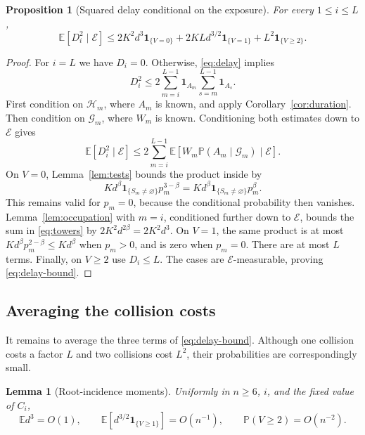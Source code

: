 \documentclass[11pt]{article}
\newtheorem{lemma}[theorem]{Lemma}
\newtheorem{proposition}[theorem]{Proposition}
\theoremstyle{remark}
\newcommand{\Prb}{\mathbb P}
\newcommand{\E}{\mathbb E}
\newcommand{\ind}{\mathbf 1}
\newcommand{\cE}{\mathcal E}
\newcommand{\cG}{\mathcal G}
\newcommand{\cH}{\mathcal H}
\numberwithin{equation}{section}
\begin{document}
\begin{proposition}[Squared delay conditional on the exposure]
\label{prop:delay}
For every $1\le i\le L$,
\begin{equation}
 \E[D_i^2\mid\cE]
 \le 2K^2d^3\ind_{\{V=0\}}
       +2KLd^{3/2}\ind_{\{V=1\}}
       +L^2\ind_{\{V\ge2\}}.
 \label{eq:delay-bound}
\end{equation}
\end{proposition}

\begin{proof}
For $i=L$ we have $D_i=0$. Otherwise, \eqref{eq:delay} implies
\[
 D_i^2\le2\sum_{m=i}^{L-1}\ind_{A_m}
                         \sum_{s=m}^{L-1}\ind_{A_s}.
\]
First condition on $\cH_m$, where $A_m$ is known, and apply
Corollary~\ref{cor:duration}. Then condition on $\cG_m$, where $W_m$
is known. Conditioning both estimates down to $\cE$ gives
\begin{equation}
 \E[D_i^2\mid\cE]
 \le2\sum_{m=i}^{L-1}
     \E[W_m\Prb(A_m\mid\cG_m)\mid\cE].
 \label{eq:towers}
\end{equation}
On $V=0$, Lemma~\ref{lem:tests} bounds the product inside by
\[
 Kd^\beta\ind_{\{S_m\ne\varnothing\}}p_m^{3-\beta}
   =Kd^\beta\ind_{\{S_m\ne\varnothing\}}p_m^\beta.
\]
This remains valid for $p_m=0$, because the conditional probability
then vanishes. Lemma~\ref{lem:occupation} with $m=i$, conditioned
further down to $\cE$, bounds the sum in \eqref{eq:towers} by
$2K^2d^{2\beta}=2K^2d^3$.
On $V=1$, the same product is at most
$Kd^\beta p_m^{2-\beta}\le Kd^\beta$ when $p_m>0$, and is zero
when $p_m=0$. There are at most $L$ terms. Finally, on $V\ge2$ use
$D_i\le L$. The cases are $\cE$-measurable, proving
\eqref{eq:delay-bound}.
\end{proof}

\subsection{Averaging the collision costs}

It remains to average the three terms of \eqref{eq:delay-bound}.
Although one collision costs a factor $L$ and two collisions cost
$L^2$, their probabilities are correspondingly small.

\begin{lemma}[Root-incidence moments]
\label{lem:moments}
Uniformly in $n\ge6$, $i$, and the fixed value of $C_i$,
\begin{equation}
 \E d^3=O(1),\qquad
 \E[d^{3/2}\ind_{\{V\ge1\}}]=O(n^{-1}),\qquad
 \Prb(V\ge2)=O(n^{-2}).
 \label{eq:moments}
\end{equation}
\end{lemma}
\end{document}
